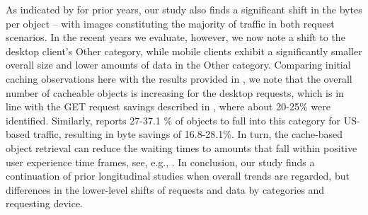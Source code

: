 As indicated by \cite{IhPa11} for prior years, our study also finds a significant shift in the bytes per object -- with  images constituting the majority of traffic in both request scenarios.
In the recent years we evaluate, however, we now note a shift to the desktop client's Other category, while mobile clients exhibit a significantly smaller overall size and lower amounts of data in the Other category.
Comparing initial caching observations here with the results provided in  \cite{CaAlPa10,IhPa11}, we note that the overall number of cacheable objects is increasing for the desktop requests, which is in line with the GET request savings described in \cite{CaAlPa10}, where about 20-25\% were identified.
Similarly, \cite{IhPa11} reports 27-37.1 \% of objects to fall into this category for US-based traffic, resulting in byte savings of 16.8-28.1\%.
In turn,  the cache-based object retrieval can reduce the waiting times to amounts that fall within positive user experience time frames, see, e.g., \cite{NiUeNa10}.
In conclusion, our study finds a continuation of prior longitudinal studies when overall trends are regarded, but differences in the lower-level shifts of requests and data by categories and requesting device.

